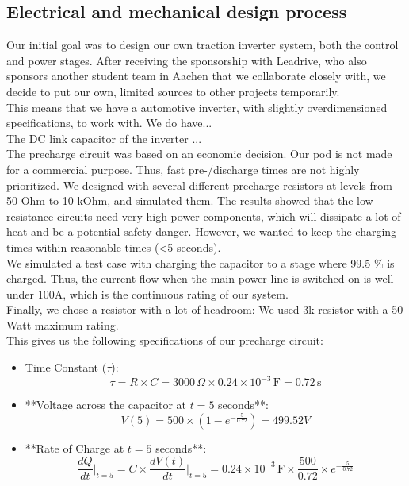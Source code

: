 \subsection{Electrical and mechanical design process}
Our initial goal was to design our own traction inverter system, both the control and power stages. After receiving the sponsorship with 
Leadrive, who also sponsors another student team
in Aachen that we collaborate closely with,
we decide to put our own, limited sources to other
projects temporarily. \\
This means that we have a automotive inverter,
with slightly overdimensioned specifications,
to work with. We do have...
\\
The DC link capacitor of the inverter ... \\
The precharge circuit was based on an economic decision. Our pod is not made for a commercial purpose. Thus, fast pre-/discharge times are not highly prioritized. We designed with several different precharge resistors at levels from 50 Ohm to 10 kOhm, and simulated them. The results showed that the low-resistance circuits need very high-power components, which will dissipate a lot of heat and be a potential safety danger. However, we wanted to keep the charging times within reasonable times (<5 seconds). \\
We simulated a test case with charging the capacitor to a stage where 99.5 \% is charged. Thus, the current flow when the main power line is switched on is well under 100A, which is the continuous rating of our system.
\\
Finally, we chose a resistor with a lot of headroom: We used 3k resistor with a 50 Watt maximum rating. \\
This gives us the following specifications of our precharge circuit:
\begin{itemize}
\item Time Constant (\( \tau \)):
\[ \tau = R \times C = 3000 \, \Omega \times 0.24 \times 10^{-3} \, \text{F} = 0.72 \, \text{s} \]

\item **Voltage across the capacitor at \( t = 5 \) seconds**:
\[ V(5) = 500 \times \left(1 - e^{-\frac{5}{0.72}}\right) = 499.52V \]

\item **Rate of Charge at \( t = 5 \) seconds**:
\[ \frac{dQ}{dt} \Bigg|_{t=5} = C \times \frac{dV(t)}{dt} \Bigg|_{t=5} = 0.24 \times 10^{-3} \, \text{F} \times \frac{500}{0.72} \times e^{-\frac{5}{0.72}} \]
\end{itemize}

